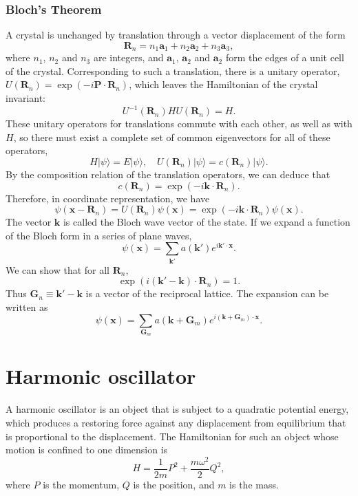\subsubsection{Bloch's Theorem}
A crystal is unchanged by translation through a vector displacement of the form
\[\bm{R}_n = n_1\bm{a}_1 + n_2\bm{a}_2 + n_3\bm{a}_3,\]
where $n_1$, $n_2$ and $n_3$ are integers, and $\bm{a}_1$, $\bm{a}_2$ and $\bm{a}_2$ form the edges of a unit cell of the crystal. Corresponding to such a translation, there is a unitary operator, $U(\bm{R}_n) = \exp(-i\bm{P}\cdot \bm{R}_n)$, which leaves the Hamiltonian of the crystal invariant:
\[U^{-1}(\bm{R}_n) H U(\bm{R}_n) = H.\]
These unitary operators for translations commute with each other, as well as with $H$, so there must exist a complete set of common eigenvectors for all of these operators,
\[H|\psi\rangle = E|\psi\rangle , \quad U(\bm{R}_n)|\psi\rangle = c(\bm{R}_n)|\psi\rangle.\]
By the composition relation of the translation operators, we can deduce that
\[c(\bm{R}_n) = \exp(-i\bm{k}\cdot\bm{R}_n).\]
Therefore, in coordinate representation, we have
\[\psi(\bm{x} - \bm{R}_n) = U(\bm{R}_n) \psi(\bm{x}) = \exp(-i\bm{k}\cdot\bm{R}_n) \psi(\bm{x}).\]
The vector $\bm{k}$ is called the Bloch wave vector of the state. If we expand a function of the Bloch form in a series of plane waves, 
\[\psi(\bm{x}) = \sum_{\bm{k}'} a(\bm{k}') e^{i\bm{k}'\cdot \bm{x}}.\]
We can show that for all $\bm{R}_n$,
\[\exp(i(\bm{k}' - \bm{k})\cdot \bm{R}_n) = 1 .\]
Thus $\bm{G}_n \equiv \bm{k}' - \bm{k}$ is a vector of the reciprocal lattice. 
The expansion can be written as
\[\psi(\bm{x}) = \sum_{\bm{G}_m} a(\bm{k} + \bm{G}_m) e^{i(\bm{k} + \bm{G}_m)\cdot\bm{x}}.\]

\section{Harmonic oscillator}
A harmonic oscillator is an object that is subject to a quadratic potential energy, which produces a restoring force against any displacement from equilibrium that is proportional to the displacement. The Hamiltonian for such an object whose motion is confined to one dimension is
\[H = \frac{1}{2m}P^2 + \frac{m\omega^2}{2}Q^2,\]
where $P$ is the momentum, $Q$ is the position, and $m$ is the mass.

